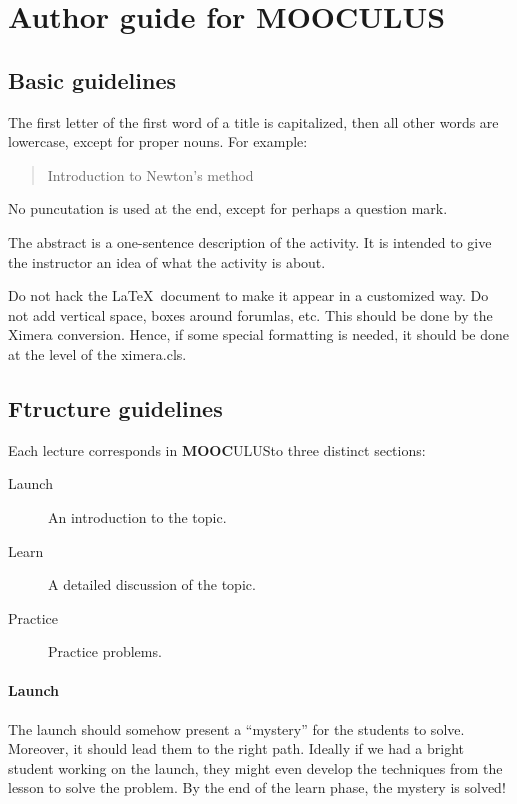 \documentclass{article}
\newcommand{\mooculus}{\textsf{\textbf{MOOC}\textnormal{\textsf{ULUS}}}}
\begin{document}
\section*{Author guide for \mooculus}

\subsection*{Basic guidelines}

The first letter of the first word of a title is capitalized, then all
other words are lowercase, except for proper nouns. For example:
\begin{quote}
Introduction to Newton's method
\end{quote}
No puncutation is used at the end, except for perhaps a question mark.


The abstract is a one-sentence description of the activity. It is
intended to give the instructor an idea of what the activity is about.


Do not hack the \LaTeX\ document to make it appear in a customized
way. Do not add vertical space, boxes around forumlas, etc. This
should be done by the Ximera conversion. Hence, if some special
formatting is needed, it should be done at the level of the
ximera.cls.

\subsection*{Ftructure guidelines}

Each lecture corresponds in \mooculus to three distinct sections:
\begin{description}
\item[Launch] An introduction to the topic.
\item[Learn] A detailed discussion of the topic.
\item[Practice] Practice problems.
\end{description}

\paragraph{Launch}

The launch should somehow present a ``mystery'' for the students to
solve.  Moreover, it should lead them to the right path. Ideally if we
had a bright student working on the launch, they might even develop
the techniques from the lesson to solve the problem.  By the end of
the learn phase, the mystery is solved!
\end{document}
